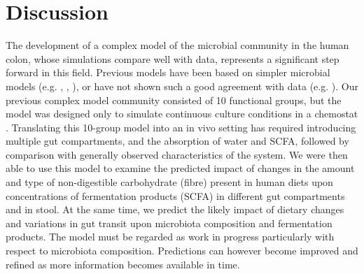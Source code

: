 \documentclass[a4paper]{article}
\begin{document}
\section*{Discussion}
The development of a complex model of the microbial community in the human colon, whose simulations compare well with data, represents a significant step forward in this field. 
Previous models have been based on simpler microbial models (e.g. \cite{Cremer17}, \cite{Munoz}, \cite{moorthy}), or have not shown such a good agreement with data (e.g. \cite{smith}).
Our previous complex model community consisted of 10 functional groups, but the model was designed only to simulate continuous culture conditions in a chemostat \citep{Kettle2015}. 
Translating this 10-group model into an in vivo setting has required introducing multiple gut compartments, and the absorption of water and SCFA, followed by comparison with generally observed characteristics of the system. 
We were then able to use this model to examine the predicted impact of changes in the amount and type of non-digestible carbohydrate (fibre) present in human diets upon concentrations of fermentation products (SCFA) in different gut compartments and in stool. At the same time, we predict the likely impact of dietary changes and variations in gut transit upon microbiota composition and fermentation products. 
The model must be regarded as work in progress particularly with respect to microbiota composition. Predictions can however become improved and refined as more information becomes available in time.
\end{document}
